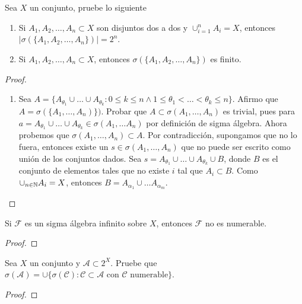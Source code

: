 \begin{statement}{4}
  Sea $X$ un conjunto, pruebe lo siguiente
  \begin{enumerate}
    \item Si $A_1, A_2, \dots, A_n \subset X$ son disjuntos dos a dos y $\cup_{i = 1}^n A_i = X$, entonces $|\sigma(\{A_1, A_2, \dots, A_n\})| = 2^n$.
    \item Si $A_1, A_2, \dots, A_n \subset X$, entonces $\sigma(\{A_1, A_2, \dots, A_n\})$ es finito.
  \end{enumerate}
\end{statement}

\begin{proof}
  \begin{enumerate}
    \item Sea $A = \{A_{\theta_1} \cup \dots \cup A_{\theta_k} : 0 \leq k \leq n \land 1 \leq \theta_1 < \dots < \theta_k \leq n\}$. Afirmo que $A = \sigma(\{A_1, \dots, A_n)\})$.
      Probar que $A \subset \sigma(A_1, \dots, A_n)$ es trivial, pues para $a = A_{\theta_1} \cup \dots \cup A_{\theta_k} \in \sigma(A_1, \dots A_n)$ por definici\'on de sigma \'algebra.
      Ahora probemos que $\sigma(A_1, \dots, A_n) \subset A$.
      Por contradicci\'on, supongamos que no lo fuera, entonces existe un $s \in \sigma(A_1, \dots, A_n)$ que no puede ser escrito como uni\'on de los conjuntos dados.
      Sea $s = A_{\theta_1} \cup \dots \cup A_{\theta_k} \cup B$,
      donde $B$ es el conjunto de elementos tales que no existe $i$ tal que $A_i \subset B$.
      Como $\cup_{n \in \mathbb N} A_i = X$, entonces $B = A_{\alpha_1} \cup \dots A_{\alpha_m}$.
  \end{enumerate}
\end{proof}

\begin{statement}{5}
  Si $\mathcal{F}$ es un sigma \'algebra infinito sobre $X$, entonces $\mathcal{F}$ no es numerable.
\end{statement}

\begin{proof}
\end{proof}

\begin{statement}{6}
  Sea $X$ un conjunto y $\mathcal{A} \subset 2^X$. Pruebe que $\sigma(\mathcal{A}) = \cup \{\sigma(\mathcal{C}) : \mathcal{C} \subset \mathcal{A} \text{ con } \mathcal{C} \text{ numerable}\}$.
\end{statement}

\begin{proof}
\end{proof}


